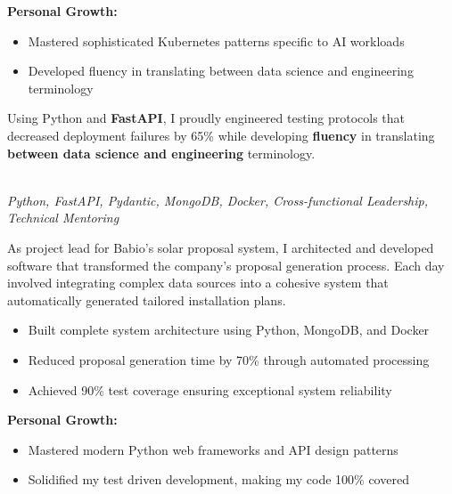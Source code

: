 \documentclass[a4paper,10pt]{article}
\newcommand{\experiencebreak}{\needspace{18\baselineskip}}
\begin{document}
\vspace{0.2cm}
\textbf{Personal Growth:}
\vspace{0.2cm}
\begin{itemize}[label=\textcolor{darkblue}{\textbullet}, leftmargin=*, nosep]
	\item Mastered sophisticated Kubernetes patterns specific to AI workloads
	\item Developed fluency in translating between data science and engineering terminology
\end{itemize}

\vspace{0.2cm}

Using Python and \textbf{FastAPI}, I proudly engineered testing protocols that decreased
deployment failures by 65\% while developing \textbf{fluency} in translating
\textbf{between data science and engineering} terminology.

\vspace{0.4cm}

\experiencebreak
\noindent\uline{} \\
\vspace{0.1cm} \hspace{0.2cm}
{\small\textit{Python, FastAPI, Pydantic, MongoDB, Docker, Cross-functional Leadership, Technical Mentoring}}

As project lead for Babio's solar proposal system, I architected and developed software that transformed the company's proposal generation process. Each day involved integrating complex data sources into a cohesive system that automatically generated tailored installation plans.

\vspace{0.2cm}
\begin{itemize}[label=\textcolor{darkblue}{\textbullet}, leftmargin=*, nosep]
	\item Built complete system architecture using Python, MongoDB, and Docker
	\item Reduced proposal generation time by 70\% through automated processing
	\item Achieved 90\% test coverage ensuring exceptional system reliability
\end{itemize}

\vspace{0.2cm}
\textbf{Personal Growth:}
\vspace{0.2cm}
\begin{itemize}[label=\textcolor{darkblue}{\textbullet}, leftmargin=*, nosep]
	\item Mastered modern Python web frameworks and API design patterns
	\item Solidified my test driven development, making my code 100\% covered
\end{itemize}
\end{document}
